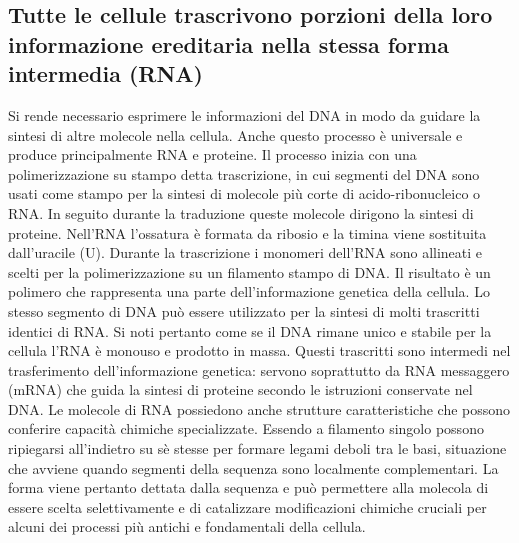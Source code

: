 \subsection{Tutte le cellule trascrivono porzioni della loro informazione ereditaria nella stessa forma intermedia (RNA)}
Si rende necessario esprimere le informazioni del DNA in modo da guidare la sintesi di altre molecole nella cellula. Anche questo processo \`e universale e 
produce principalmente RNA e proteine. Il processo inizia con una polimerizzazione su stampo detta trascrizione, in cui segmenti del DNA sono usati come
stampo per la sintesi di molecole pi\`u corte di acido-ribonucleico o RNA. In seguito durante la traduzione queste molecole dirigono la sintesi di proteine.
Nell'RNA l'ossatura \`e formata da ribosio e la timina viene sostituita dall'uracile (U). Durante la trascrizione i monomeri dell'RNA sono allineati e 
scelti per la polimerizzazione su un filamento stampo di DNA. Il risultato \`e un polimero che rappresenta una parte dell'informazione genetica della 
cellula. Lo stesso segmento di DNA pu\`o essere utilizzato per la sintesi di molti trascritti identici di RNA. Si noti pertanto come se il DNA rimane unico 
e stabile per la cellula l'RNA \`e monouso e prodotto in massa. Questi trascritti sono intermedi nel trasferimento dell'informazione genetica: servono 
soprattutto da RNA messaggero (mRNA) che guida la sintesi di proteine secondo le istruzioni conservate nel DNA. Le molecole di RNA possiedono anche 
strutture caratteristiche che possono conferire capacit\`a chimiche specializzate. Essendo a filamento singolo possono ripiegarsi all'indietro su s\`e 
stesse per formare legami deboli tra le basi, situazione che avviene quando segmenti della sequenza sono localmente complementari. La forma viene pertanto 
dettata dalla sequenza e pu\`o permettere alla molecola di essere scelta selettivamente e di catalizzare modificazioni chimiche cruciali per alcuni dei 
processi pi\`u antichi e fondamentali della cellula.
